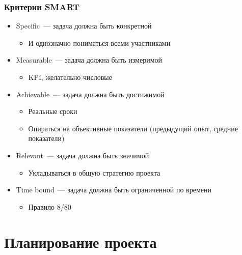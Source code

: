 \documentclass{../../slides-style}
\begin{document}
    \begin{frame}
        \frametitle{Критерии SMART}
        \begin{itemize}
            \item Specific~--- задача должна быть конкретной
            \begin{itemize}
                \item И однозначно пониматься всеми участниками
            \end{itemize}
            \item Measurable~--- задача должна быть измеримой
            \begin{itemize}
                \item KPI, желательно числовые
            \end{itemize}
            \item Achievable~--- задача должна быть достижимой 
            \begin{itemize}
                \item Реальные сроки
                \item Опираться на объективные показатели (предыдущий опыт, средние показатели)
            \end{itemize}
            \item Relevant~--- задача должна быть значимой
            \begin{itemize}
                \item Укладываться в общую стратегию проекта
            \end{itemize}
            \item Time bound~--- задача должна быть ограниченной по времени
            \begin{itemize}
                \item Правило 8/80
            \end{itemize}
        \end{itemize}
    \end{frame}

    \section{Планирование проекта}
\end{document}
